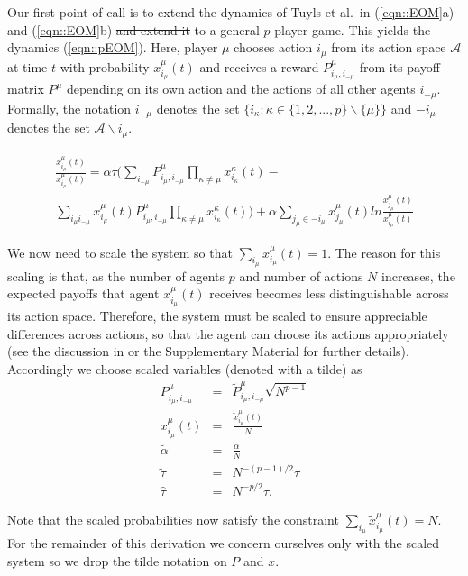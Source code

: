 \documentclass[sigconf,anonymous]{aamas}
\newcommand{\xmu}[2]{x_{#1_#2}^{#2}(t)}
\newcommand{\payoff}[2]{P^{#2}_{#1_#2, #1_{-#2}}}
\newcommand{\txmu}[2]{\tilde{x}_{#1_#2}^{#2}(t)}
\newcommand{\tpayoff}[2]{\tilde{P}^{#2}_{#1_#2, #1_{-#2}}}
\newcommand{\talpha}{\tilde{\alpha}}
\newcommand{\ttau}{\tilde{\tau}}
\newcommand{\htau}{\hat{\tau}}
\begin{document}
Our first point of call is to extend the dynamics of Tuyls et al.~in  (\ref{eqn::EOM}a) and (\ref{eqn::EOM}b) \st{and extend it} to a general $p$-player game. This yields the dynamics (\ref{eqn::pEOM}). Here, player $\mu$ chooses action $i_{\mu}$ from its action space $\mathcal{A}$ at time $t$ with probability $\xmu{i}{\mu}$ and receives a reward $\payoff{i}{\mu}$ from its payoff matrix $P^\mu$ depending on its own action and the actions of all other agents $i_{-\mu}$. Formally, the notation $i_{-\mu}$ denotes the set $\{ i_\kappa : \kappa \in \{1, 2, ..., p\} \backslash \{\mu\} \}$ and $-i_{\mu}$ denotes the set $\mathcal{A} \backslash {i_\mu}$.

\begin{equation}
\begin{split}
    \label{eqn::pEOM}
    \frac{\dot{\xmu{i}{\mu}}}{\xmu{i}{\mu}} = \alpha \tau ( \sum_{i_{-\mu}} \payoff{i}{\mu} \prod_{\kappa \neq \mu} \xmu{i}{\kappa} - \\ \sum_{i_\mu i_{-\mu}} \xmu{i}{\mu} \payoff{i}{\mu} \prod_{\kappa \neq \mu} \xmu{i}{\kappa} ) + \alpha \sum_{j_\mu \in -i_\mu} \xmu{j}{\mu} ln \frac{\xmu{j}{\mu}}{\xmu{i}{\mu}}
\end{split}
\end{equation}

We now need to scale the system so that $\sum_{i_\mu} \xmu{i}{\mu} = 1$. The reason for this scaling is that, as the number of agents $p$ and number of actions $N$ increases, the expected payoffs that agent $\xmu{i}{\mu}$ receives becomes less distinguishable across its action space. Therefore, the system must be scaled to ensure appreciable differences across actions, so that the agent can choose its actions appropriately (see the discussion in \cite{Sanders2018} or the Supplementary Material for further details). Accordingly we choose scaled variables (denoted with a tilde) as
%
\begin{eqnarray*}
        \payoff{i}{\mu} & = & \tpayoff{i}{\mu} \sqrt{N^{p-1}}\\
        \xmu{i}{\mu} & = & \frac{\txmu{i}{\mu}}{N} \\
        \talpha & = & \frac{\alpha}{N} \\
        \ttau & = & N^{-(p-1)/2} \tau \\
        \htau & = & N^{-p/2} \tau.
\end{eqnarray*}

Note that the scaled probabilities now satisfy the constraint $\sum_{i_\mu} \txmu{i}{\mu} = N$. For the remainder of this derivation we concern ourselves only with the scaled system so we drop the tilde notation on $P$ and $x$. 
\end{document}
